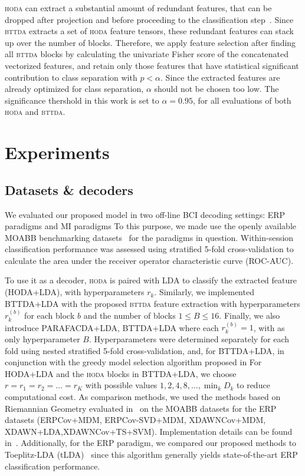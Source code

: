 \documentclass[twocolumn]{article}
\begin{document}
\textsc{hoda} can extract a substantial amount of redundant features, that can
be dropped after projection and before proceeding to the classification
step~\cite{Phan2010}.
Since \textsc{bttda} extracts a set of \textsc{hoda}
feature tensors, these redundant features can stack up over the number of
blocks.
Therefore, we apply feature selection after finding all \textsc{bttda} blocks
by calculating the univariate Fisher score of the concatenated vectorized
features, and retain only those features that have  statistical significant
contribution to class separation with $p<\alpha$.
Since the extracted features are already optimized for class separation,
$\alpha$ should not be chosen too low.
The significance thershold in this work is set to $\alpha=0.95$, for all
evaluations of both \textsc{hoda} and \textsc{bttda}.


\section{Experiments}
\subsection{Datasets \& decoders}
We evaluated our proposed model in two off-line BCI decoding settings: ERP
paradigms and MI paradigms
To this purpose, we made use the openly available MOABB benchmarking
datasets~\cite{Aristimunha2023} for the paradigms in question.
Within-session classification performance was assessed using stratified 5-fold
cross-validation to calculate the area under the receiver operator
characteristic curve (ROC-AUC).

To use it as a decoder, \textsc{hoda} is paired with LDA to classify the
extracted feature (HODA+LDA), with hyperparameters $r_k$.
Similarly, we implemented BTTDA+LDA with the proposed \textsc{bttda} feature
extraction with hyperparameters $r_k^{(b)}$ for each block $b$ and the number of blocks
$1\leq B\leq16$.
Finally, we also introduce PARAFACDA+LDA, BTTDA+LDA where each $r_k^{(b)}=1$, with
as only hyperparameter $B$.
Hyperparameters were determined separately for each fold using nested
stratified 5-fold cross-validation, and, for BTTDA+LDA, in conjunction with the
greedy model selection algorithm proposed in 
For HODA+LDA and the \textsc{hoda} blocks in BTTDA+LDA, we choose
$r=r_1=r_2=\ldots=r_K$ with possible values $1,2,4,8,\ldots,\min_kD_k$
to reduce computational cost.
As comparison methods, we used the methods based on
Riemannian Geometry evaluated in~\cite{Chevallier2024} on
the MOABB datasets for the ERP datasets (ERPCov+MDM, ERPCov-SVD+MDM,
XDAWNCov+MDM, XDAWN+LDA,XDAWNCov+TS+SVM).
Implementation details can be found in~\cite{Chevallier2024}.
Additionally, for the ERP paradigm, we compared our proposed methods to
Toeplitz-LDA (tLDA)~\cite{Sosulski2022} since this algorithm generally yields state-of-the-art
ERP classification performance.
\end{document}
